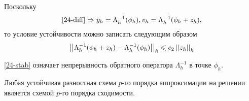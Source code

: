 Поскольку
\begin{align*}
  \eqref{24-diff} \Rightarrow y_h = \Lambda_h^{-1}(\phi_h), v_h =
  \Lambda_h^{-1}(\phi_h + z_h),
\end{align*}
то условие устойчивости можно записать следующим образом
\begin{equation}
  \label{24-stab}
  \left\lvert\left\lvert\Lambda_h^{-1}(\phi_h + z_h) - \Lambda_h^{-1}(\phi_h)\right\rvert\right\rvert_h \leqslant c_2
  \left\lvert\left\lvert z_h\right\rvert\right\rvert_h
\end{equation}

\eqref{24-stab} означает непрерывность обратного оператора $\Lambda_h^{-1}$ в точке
$\phi_h$.

\begin{theorem}[Лакса]
  Любая устойчивая разностная схема $p$-го порядка аппроксимации на решении является
  схемой $p$-го порядка сходимости.
\end{theorem}
